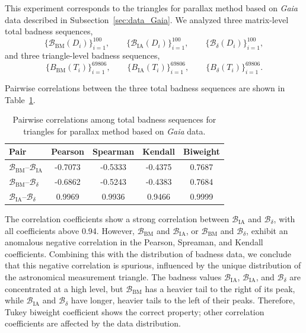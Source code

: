 \documentclass[11pt]{article}
\begin{document}
This experiment corresponds to the triangles for parallax method based on \textit{Gaia} data described in Subsection~\ref{sec:data_Gaia}. We analyzed three matrix-level total badness sequences,
\[
\{\mathcal{B}_{\mathrm{BM}}(D_i)\}_{i=1}^{100},\qquad
\{\mathcal{B}_{\mathrm{IA}}(D_i)\}_{i=1}^{100},\qquad
\{\mathcal{B}_{\delta}(D_i)\}_{i=1}^{100},
\]
and three triangle-level badness sequences, 
\[
\{B_{\mathrm{BM}}(T_i)\}_{i=1}^{69806},\qquad
\{B_{\mathrm{IA}}(T_i)\}_{i=1}^{69806},\qquad
\{B_{\delta}(T_i)\}_{i=1}^{69806}.
\]

Pairwise correlations between the three total badness sequences are shown in Table~\ref{tab:Gaia_matrix_corr}.
\begin{table}[h!]
\centering
\caption{Pairwise correlations among total badness sequences for triangles for parallax method based on \textit{Gaia} data.}
\label{tab:Gaia_matrix_corr}
\small
\setlength{\tabcolsep}{7pt}
\begin{tabular}{lcccc}
\hline
Pair & Pearson & Spearman & Kendall & Biweight \\
\hline
\(\mathcal{B}_{\mathrm{BM}}\)--\(\mathcal{B}_{\mathrm{IA}}\) & -0.7073 & -0.5333 & -0.4375 & 0.7687 \\
\(\mathcal{B}_{\mathrm{BM}}\)--\(\mathcal{B}_{\delta}\) & -0.6862 & -0.5243 & -0.4383 & 0.7684 \\
\(\mathcal{B}_{\mathrm{IA}}\)--\(\mathcal{B}_{\delta}\) & 0.9969 & 0.9936 & 0.9466 & 0.9999 \\
\hline
\end{tabular}
\end{table}

The correlation coefficients show a strong correlation between \(\mathcal{B}_{\mathrm{IA}}\) and \(\mathcal{B}_{\delta}\), with all coefficients above 0.94. However, \(\mathcal{B}_{\mathrm{BM}}\) and \(\mathcal{B}_{\mathrm{IA}}\), or \(\mathcal{B}_{\mathrm{BM}}\) and \(\mathcal{B}_{\delta}\), exhibit an anomalous negative correlation in the Pearson, Spreaman, and Kendall coefficients. Combining this with the distribution of badness data, we conclude that this negative correlation is spurious, influenced by the unique distribution of the astronomical measurement triangle. The badness values \(\mathcal{B}_{\mathrm{IA}}\), \(\mathcal{B}_{\mathrm{IA}}\), and \(\mathcal{B}_{\delta}\) are concentrated at a high level, but \(\mathcal{B}_{\mathrm{BM}}\) has a heavier tail to the right of its peak, while \(\mathcal{B}_{\mathrm{IA}}\) and \(\mathcal{B}_{\delta}\) have longer, heavier tails to the left of their peaks. Therefore, Tukey biweight coefficient shows the correct property; other correlation coefficients are affected by the data distribution.
\end{document}
